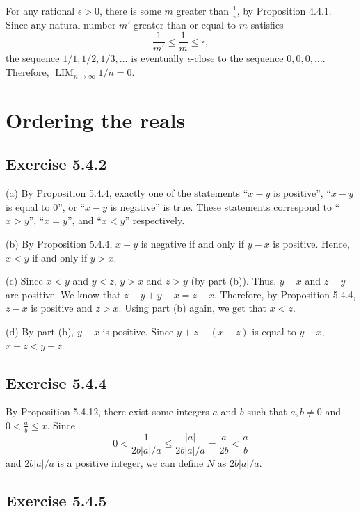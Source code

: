 \documentclass[12pt, oneside]{book}
\DeclareMathOperator*{\formallim}{LIM}
\begin{document}
	For any rational $\epsilon > 0$, there is some $m$ greater than $\frac{1}{\epsilon}$, by Proposition 4.4.1. Since any natural number $m'$ greater than or equal to $m$ satisfies
	\[\frac{1}{m'} \le \frac{1}{m} \le \epsilon,\]
	the sequence $1/1, 1/2, 1/3, \dotsc$ is eventually $\epsilon$-close to the sequence $0, 0, 0, \dotsc$. Therefore, $\formallim_{n \to \infty} 1/n = 0$.
	
	\section{Ordering the reals}
	
	\subsection*{Exercise 5.4.2}
	
	\noindent (a) By Proposition 5.4.4, exactly one of the statements ``$x - y$ is positive'', ``$x - y$ is equal to $0$'', or ``$x - y$ is negative'' is true. These statements correspond to ``$x > y$'', ``$x = y$'', and ``$x < y$'' respectively.
	
	\bigskip
	\noindent (b) By Proposition 5.4.4, $x - y$ is negative if and only if $y - x$ is positive. Hence, $x < y$ if and only if $y > x$.
	
	\bigskip
	\noindent (c) Since $x < y$ and $y < z$, $y > x$ and $z > y$ (by part (b)). Thus, $y - x$ and $z - y$ are positive. We know that $z - y + y - x = z - x$. Therefore, by Proposition 5.4.4, $z - x$ is positive and $z > x$. Using part (b) again, we get that $x < z$.
	
	\bigskip
	\noindent (d) By part (b), $y - x$ is positive. Since $y + z - (x + z)$ is equal to $y - x$, $x + z < y + z$.
	
	\subsection*{Exercise 5.4.4}
	
	By Proposition 5.4.12, there exist some integers $a$ and $b$ such that $a, b \ne 0$ and $0 < \frac{a}{b} \le x$. Since
	\[0 < \frac{1}{2b|a| / a} \le \frac{|a|}{2b|a| / a} = \frac{a}{2b} < \frac{a}{b}\]
	 and $2b|a| / a$ is a positive integer, we can define $N$ as $2b|a| / a$.
	
	\subsection*{Exercise 5.4.5}
	
\end{document}
